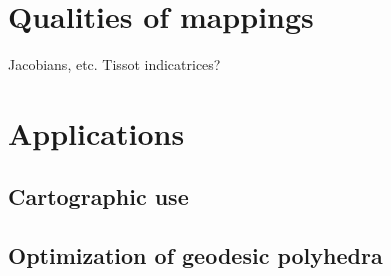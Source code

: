 \documentclass{amsart}[12pt]
\begin{document}
\section{Qualities of mappings}
Jacobians, etc.
Tissot indicatrices?

\section{Applications}
\subsection{Cartographic use}

\subsection{Optimization of geodesic polyhedra}



\end{document}
